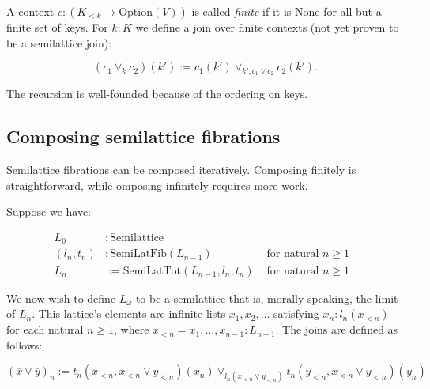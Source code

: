 \documentclass{article}
\begin{document}
      A context $c : (K_{<k} \to \mathrm{Option}(V))$ is called \emph{finite} if it is $\mathrm{None}$ for all but a finite set of keys. For $k : K$ we define a join over finite contexts (not yet proven to be a semilattice join):

      $$ (c_1 \vee_k c_2)(k') := c_1(k') \vee_{k', c_1 \vee c_2} c_2(k').$$

      The recursion is well-founded because of the ordering on keys.

    \subsection{Composing semilattice fibrations}

      Semilattice fibrations can be composed iteratively. Composing finitely is straightforward, while omposing infinitely requires more work.

      Suppose we have:

      \begin{align*}
        L_0 &: \mathrm{Semilattice} & \\
        (l_n, t_n) &: \mathrm{SemiLatFib}(L_{n-1}) & \text{ for natural $n \geq 1$ } \\
        L_n &:= \mathrm{SemiLatTot}(L_{n-1}, l_n, t_n)    & \text{ for natural $n \geq 1$ }
      \end{align*}

      We now wish to define $L_\omega$ to be a semilattice that is, morally speaking, the limit of $L_n$. This lattice's elements are infinite lists $x_1, x_2, \ldots$ satisfying $x_n : l_n(x_{<n})$ for each natural $n \geq 1$, where $x_{<n} = x_1, \ldots, x_{n-1} : L_{n-1}$. The joins are defined as follows:

      $$(\overline{x} \vee \overline{y})_n := t_n(x_{<n}, x_{<n} \vee y_{<n})(x_n) \vee_{l_n(x_{<n} \vee y_{<n})} t_n(y_{<n}, x_{<n} \vee y_{<n})(y_n)$$
\end{document}
